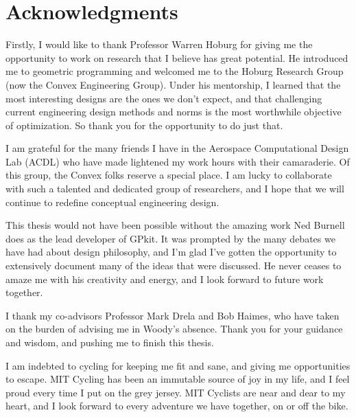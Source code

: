 % 

\cleardoublepage

\section*{Acknowledgments}

Firstly, I would like to thank Professor Warren Hoburg for giving me
the opportunity to work on research that I believe has great potential.
He introduced me to geometric programming and welcomed me to the Hoburg Research Group
(now the Convex Engineering Group). Under his mentorship, I learned that the most interesting designs
are the ones we don't expect, and that challenging current engineering design methods and norms
is the most worthwhile objective of optimization.
So thank you for the opportunity to do just that.

I am grateful for the many friends I have in the Aerospace Computational Design
Lab (ACDL) who have made lightened my work hours with their camaraderie. Of this group,
the Convex folks reserve a special place. I am lucky to collaborate with
such a talented and dedicated group of researchers, and I hope that we will continue
to redefine conceptual engineering design.

This thesis would not have been possible without the amazing work Ned Burnell does
as the lead developer of GPkit. It was prompted by the many debates we have had about
design philosophy,
and I'm glad I've gotten the opportunity to extensively document many of the ideas
that were discussed.
He never ceases to amaze me with his creativity and energy, and I look
forward to future work together.

I thank my co-advisors Professor Mark Drela and Bob Haimes, who have taken on the burden of advising
me in Woody's absence. Thank you for your guidance and wisdom, and pushing me to
finish this thesis.

I am indebted to cycling for keeping me fit and sane, and giving me opportunities to
escape. MIT Cycling has been an immutable source of joy in my life, and I feel proud
every time I put on the grey jersey. MIT Cyclists are near and dear to my heart, and
I look forward to every adventure we have together, on or off the bike.


